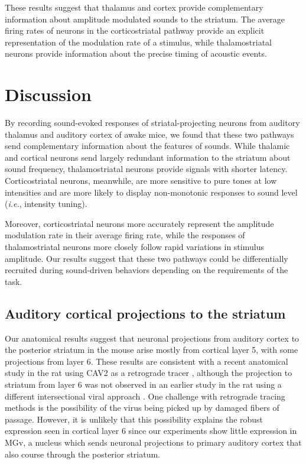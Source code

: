 These results suggest that thalamus and cortex provide complementary information about amplitude modulated sounds to the striatum.
%
The average firing rates of neurons in the corticostriatal pathway provide an explicit representation of the modulation rate of a stimulus, while thalamostriatal neurons provide information about the precise timing of acoustic events. 

\section{Discussion}

By recording sound-evoked responses of striatal-projecting neurons from auditory thalamus and auditory cortex of awake mice, we found that these two pathways send complementary information about the features of sounds.
%
While thalamic and cortical neurons send largely redundant information to the striatum about sound frequency, thalamostriatal neurons provide signals with shorter latency. 
%
Corticostriatal neurons, meanwhile, are more sensitive to pure tones at low intensities and are more likely to display non-monotonic responses to sound level (\emph{i.e.}, intensity tuning).

Moreover, corticostriatal neurons more accurately represent the amplitude modulation rate in their average firing rate, while the responses of thalamostriatal neurons more closely follow rapid variations in stimulus amplitude.
%
Our results suggest that these two pathways could be differentially recruited during sound-driven behaviors depending on the requirements of the task.

\subsection{Auditory cortical projections to the striatum}
Our anatomical results suggest that neuronal projections from auditory cortex to the posterior striatum in the mouse arise mostly from cortical layer 5, with some projections from layer 6. 
%
These results are consistent with a recent anatomical study in the rat using CAV2 as a retrograde tracer \citep{Jiang2018}, although the projection to striatum from layer 6 was not observed in an earlier study in the rat using a different intersectional viral approach \citep{Znamenskiy2013}. 
%
One challenge with retrograde tracing methods is the possibility of the virus being picked up by damaged fibers of passage. However, it is unlikely that this possibility explains the robust expression seen in cortical layer 6 since our experiments show little expression in MGv, a nucleus which sends neuronal projections to primary auditory cortex that also course through the posterior striatum.

